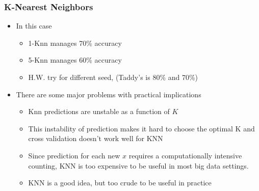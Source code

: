 \documentclass[
  shownotes,
  xcolor={svgnames},
  hyperref={colorlinks,citecolor=DarkBlue,linkcolor=DarkRed,urlcolor=DarkBlue}
  , aspectratio=169]{beamer}
\begin{document}
\begin{frame}[fragile]
\end{frame}


\begin{frame}[fragile]
\frametitle{K-Nearest Neighbors}
\begin{itemize}
\item In this case
  \begin{itemize}
    \item 1-Knn manages 70\% accuracy
    \item 5-Knn manages 60\% accuracy
    \item H.W. try for different seed, (Taddy's is 80\% and 70\%)
  \end{itemize}
  \medskip
  \item There are some major problems with practical implications
  \begin{itemize}
  \item Knn predictions are unstable as a function of $K$
  \medskip
  \item This instability of prediction makes it hard to choose the optimal K and cross validation doesn't work well for KNN
  \medskip
  \item Since prediction for each new $x$ requires a computationally intensive counting, KNN is too expensive to be useful in most big data settings.
  \medskip
  \item KNN is a good idea, but too crude to be useful in practice
  \end{itemize}
\end{itemize}

\end{frame}
\end{document}
